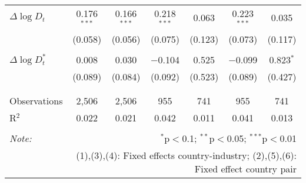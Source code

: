 \begin{tabular}{@{\extracolsep{5pt}}lcccccc}
 $\Delta \log D_t$ & 0.176$^{***}$ & 0.166$^{***}$ & 0.218$^{***}$ & 0.063 & 0.223$^{***}$ & 0.035 \\ 
  & (0.058) & (0.056) & (0.075) & (0.123) & (0.073) & (0.117) \\ 
  & & & & & & \\ 
 $\Delta \log D_t^*$ & 0.008 & 0.030 & $-$0.104 & 0.525 & $-$0.099 & 0.823$^{*}$ \\ 
  & (0.089) & (0.084) & (0.092) & (0.523) & (0.089) & (0.427) \\ 
  & & & & & & \\ 
\hline \\[-1.8ex] 
Observations & 2,506 & 2,506 & 955 & 741 & 955 & 741 \\ 
R$^{2}$ & 0.022 & 0.021 & 0.042 & 0.011 & 0.041 & 0.013 \\ 
\hline 
\hline \\[-1.8ex] 
\textit{Note:}  & \multicolumn{6}{r}{$^{*}$p$<$0.1; $^{**}$p$<$0.05; $^{***}$p$<$0.01} \\ 
 & \multicolumn{6}{r}{(1),(3),(4): Fixed effects country-industry; (2),(5),(6): Fixed effect country pair} \\ 
\end{tabular} 
